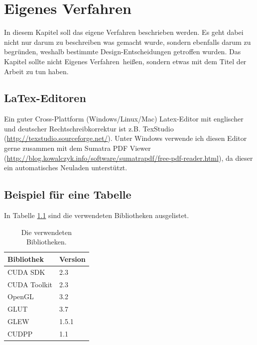 \chapter{Eigenes Verfahren}
In diesem Kapitel soll das eigene Verfahren beschrieben werden. Es geht dabei nicht nur darum zu beschreiben was gemacht wurde, sondern ebenfalls darum zu begründen, weshalb bestimmte Design-Entscheidungen getroffen wurden. Das Kapitel sollte nicht \glqq Eigenes Verfahren\grqq \ heißen, sondern etwas mit dem Titel der Arbeit zu tun haben.

\section{LaTex-Editoren}

Ein guter Cross-Plattform (Windows/Linux/Mac) Latex-Editor mit englischer und deutscher Rechtschreibkorrektur ist z.B. TexStudio
(\url{http://texstudio.sourceforge.net/}). Unter Windows verwende ich diesen Editor gerne zusammen mit dem Sumatra PDF Viewer (\url{http://blog.kowalczyk.info/software/sumatrapdf/free-pdf-reader.html}), da dieser ein automatisches Neuladen unterstützt.

\section{Beispiel für eine Tabelle}
In Tabelle \ref{tab:bibliotheken} sind die verwendeten Bibliotheken ausgelistet.
\begin{table}[htbp]
\centering 
\begin{tabular}{ll}
\toprule \textbf{Bibliothek} & \textbf{Version} \\
\bottomrule
CUDA SDK & 2.3 \\
CUDA Toolkit & 2.3 \\
 OpenGL & 3.2 \\
 GLUT & 3.7 \\
GLEW & 1.5.1 \\
CUDPP & 1.1 \\
\bottomrule
\end{tabular}
\caption{Die verwendeten Bibliotheken.}
\label{tab:bibliotheken}
\end{table}

